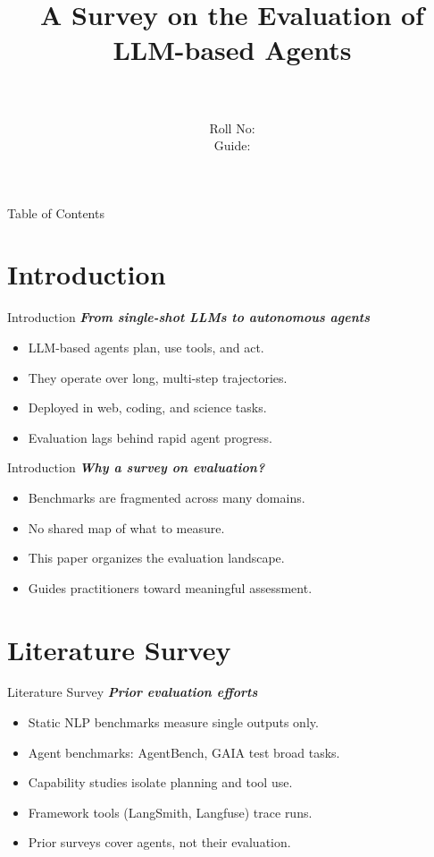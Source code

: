 \documentclass{beamer}
\title[\seminarShortTitle]{A Survey on the Evaluation of LLM-based Agents}
\author[\seminarName\ (\seminarShortCollege)]{\seminarName \\ \seminarRoll \\ Roll No: \seminarClassRoll \\ Guide: \seminarGuide}
\institute[\seminarShortCollege]{\seminarDept \\ \seminarCollege}
\date{\seminarDate}
\begin{document}
\begin{frame}\titlepage\end{frame}
\begin{frame}{Table of Contents}\tableofcontents\end{frame}
\section{Introduction}
\begin{frame}{Introduction}
\textbf{\textit{From single-shot LLMs to autonomous agents}}
\begin{itemize}
\item LLM-based agents plan, use tools, and act.
\item They operate over long, multi-step trajectories.
\item Deployed in web, coding, and science tasks.
\item Evaluation lags behind rapid agent progress.
\end{itemize}
\end{frame}
\begin{frame}{Introduction}
\textbf{\textit{Why a survey on evaluation?}}
\begin{itemize}
\item Benchmarks are fragmented across many domains.
\item No shared map of what to measure.
\item This paper organizes the evaluation landscape.
\item Guides practitioners toward meaningful assessment.
\end{itemize}
\end{frame}

\section{Literature Survey}
\begin{frame}{Literature Survey}
\textbf{\textit{Prior evaluation efforts}}
\begin{itemize}
\item Static NLP benchmarks measure single outputs only.
\item Agent benchmarks: AgentBench, GAIA test broad tasks.
\item Capability studies isolate planning and tool use.
\item Framework tools (LangSmith, Langfuse) trace runs.
\item Prior surveys cover agents, not their evaluation.
\end{itemize}
\end{frame}
\end{document}
